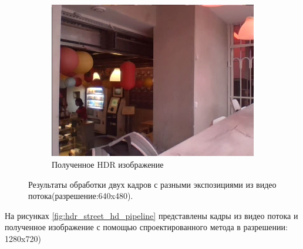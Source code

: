 \begin{figure}[!tbp]
\begin{subfigure}{1\textwidth}
    \includegraphics[width=\textwidth]{img/hdr_cafe_deghost.png}
    \caption{ Полученное HDR изображение}
    \label{fig:hdr_cafe_deghost}
  \end{subfigure}
  \caption { Результаты обработки двух кадров с разными экспозициями из видео потока(разрешение:640x480).}
  \label{fig:hdr_cafe_pipeline}
\end{figure}

На рисунках \ref{fig:hdr_street_hd_pipeline} представлены кадры из видео потока и полученное изображение с помощью спроектированного метода в разрешении: 1280x720)

